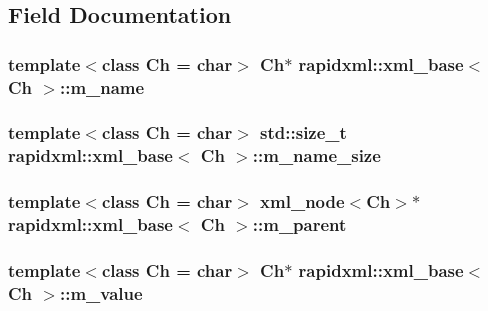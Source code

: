 \subsection{Field Documentation}
\hypertarget{classrapidxml_1_1xml__base_afd9851ed43e14619db0d7075ef8e9e8a}{
\subsubsection[{m\_\-name}]{\setlength{\rightskip}{0pt plus 5cm}template$<$class Ch = char$>$ Ch$\ast$ {\bf rapidxml::xml\_\-base}$<$ Ch $>$::{\bf m\_\-name}}}
\label{d4/d48/classrapidxml_1_1xml__base_afd9851ed43e14619db0d7075ef8e9e8a}
\hypertarget{classrapidxml_1_1xml__base_a5a8c76a7274b4180213796422c4df76f}{
\subsubsection[{m\_\-name\_\-size}]{\setlength{\rightskip}{0pt plus 5cm}template$<$class Ch = char$>$ std::size\_\-t {\bf rapidxml::xml\_\-base}$<$ Ch $>$::{\bf m\_\-name\_\-size}}}
\label{d4/d48/classrapidxml_1_1xml__base_a5a8c76a7274b4180213796422c4df76f}
\hypertarget{classrapidxml_1_1xml__base_a90d5f660f078f66563fd7b2d8387ccb0}{
\subsubsection[{m\_\-parent}]{\setlength{\rightskip}{0pt plus 5cm}template$<$class Ch = char$>$ {\bf xml\_\-node}$<$Ch$>$$\ast$ {\bf rapidxml::xml\_\-base}$<$ Ch $>$::{\bf m\_\-parent}}}
\label{d4/d48/classrapidxml_1_1xml__base_a90d5f660f078f66563fd7b2d8387ccb0}
\hypertarget{classrapidxml_1_1xml__base_a278a1ea63b0b70219b946cec47fa00ea}{
\subsubsection[{m\_\-value}]{\setlength{\rightskip}{0pt plus 5cm}template$<$class Ch = char$>$ Ch$\ast$ {\bf rapidxml::xml\_\-base}$<$ Ch $>$::{\bf m\_\-value}}}
